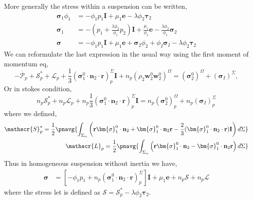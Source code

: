 More generally the stress within a suspension can be written,
\begin{align*}
    \bm{\sigma}_1 \phi_1
    &=- \phi_1 p_1 \textbf{I}
    + \mu_1 \textbf{e}
    - \lambda \phi_2 \bm{\tau}_2\\
    \bm{\sigma}_1 
    &= - \left(p_1 + \frac{\lambda \phi_2}{\phi_1} p_2\right) \textbf{I}
    + \frac{\mu_1}{\phi_1} \textbf{e}
    - \frac{\lambda \phi_2}{\phi_1} \bm{\sigma}_2\\
    \bm{\sigma}
    &= - \phi_1 p_1  \textbf{I}
    + \mu_1 \textbf{e}
    + \bm{\sigma}_2 \phi_2 
    +\phi_I \bm{\sigma}_I 
    - \lambda \phi_2 \bm{\tau}_2
\end{align*}
We can reformulate the last expression in the usual way using the first moment of momentum eq, 
\begin{equation}
    -  \dot{\mathcal{P}_p}
    +  \mathscr{S}_p^*
    +  \mathscr{L}_p
    + \frac{1}{3}(\bm{\sigma}_1^0 \cdot \textbf{n}_2 \cdot \textbf{r})_p^\Sigma \textbf{I}
    + n_p (\rho_2 \textbf{w}_2^0  \textbf{w}_2^0 )^\Omega
    =   (\bm{\sigma}_2^0)^\Omega
    + (\bm{\sigma}_I)^\Sigma,
\end{equation}
Or in stokes condition, 
\begin{equation}
    n_p \mathscr{S}_p^*
+ n_p \mathscr{L}_p
+ n_p\frac{1}{3}(\bm{\sigma}_1^0 \cdot \textbf{n}_2 \cdot \textbf{r})_p^\Sigma \textbf{I}
    = n_p \left(
        \bm{\sigma}_2^0
    \right)_p^\Omega
    +n_p (\bm{\sigma}_I)^\Sigma_p
\end{equation}
where we defined, 
\begin{align*}
    \mathscr{S}_p^* =\frac{1}{2} \pnavg{\int_{\Sigma_\alpha} \left(
        \textbf{r} \bm{\sigma}_1^0 \cdot \textbf{n}_2
        +  \bm{\sigma}_1^0 \cdot \textbf{n}_2\textbf{r}
        -
          \frac{2}{3}(\bm{\sigma}_1^0 \cdot \textbf{n}_2 \cdot \textbf{r})\textbf{I}
        \right)  d\Sigma}\\
    \mathscr{L}_p =\frac{1}{2} \pnavg{\int_{\Sigma_\alpha} \left(
        \textbf{r} \bm{\sigma}_1^0 \cdot \textbf{n}_2
        - \bm{\sigma}_1^0 \cdot \textbf{n}_2\textbf{r}
        \right) d\Sigma}
\end{align*}
Thus in homogeneous suspension without inertia we have, 
\begin{align*}
    \bm{\sigma}
    &= [- \phi_1 p_1 
    + n_p (\bm{\sigma}_1^0 \cdot \textbf{n}_2 \cdot \textbf{r})^\Sigma_p] \textbf{I}
    + \mu_1 \textbf{e}
    + n_p \mathscr{S}
    + n_p \mathscr{L}
\end{align*}
where the stress let is defined as $\mathscr{S} = \mathscr{S}_p^* - \lambda \phi_2 \bm{\tau}_2$. 
